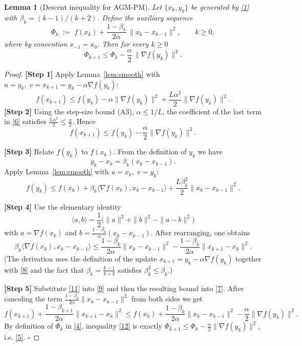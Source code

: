 \documentclass{article}
\newtheorem{lemma}{Lemma}
\begin{document}
\begin{lemma}[Descent inequality for AGM‑PM]\label{lem:descent}
Let \(\{x_k,y_k\}\) be generated by \eqref{1} with \(\beta_k=(k-1)/(k+2)\).
Define the auxiliary sequence
\[
\Phi_k \;:=\; f(x_k) + \frac{1-\beta_k}{2\alpha}\,\|x_k-x_{k-1}\|^{2},
\qquad k\ge 0,
\tag{4}
\]
where by convention \(x_{-1}=x_0\). Then for every \(k\ge0\)
\[
\Phi_{k+1}\le \Phi_k - \frac{\alpha}{2}\,\|\nabla f(y_k)\|^{2}.
\tag{5}
\]
\end{lemma}
\begin{proof}
\textbf{[Step 1]} Apply Lemma~\ref{lem:smooth} with
\(u=y_k,\;v=x_{k+1}=y_k-\alpha\nabla f(y_k)\):
\[
f(x_{k+1})\le f(y_k)-\alpha\|\nabla f(y_k)\|^{2}
               +\frac{L\alpha^{2}}{2}\|\nabla f(y_k)\|^{2}.
\tag{6}
\]
\textbf{[Step 2]} Using the step‑size bound (A3), \(\alpha\le 1/L\),
the coefficient of the last term in \eqref{6} satisfies
\(\frac{L\alpha^{2}}{2}\le\frac{\alpha}{2}\). Hence
\[
f(x_{k+1})\le f(y_k)-\frac{\alpha}{2}\|\nabla f(y_k)\|^{2}.
\tag{7}
\]

\textbf{[Step 3]} Relate \(f(y_k)\) to \(f(x_k)\). From the definition of
\(y_k\) we have
\[
y_k-x_k = \beta_k (x_k-x_{k-1}).
\tag{8}
\]
Apply Lemma~\ref{lem:smooth} with \(u=x_k,\;v=y_k\):
\[
f(y_k)\le f(x_k)+\beta_k\langle\nabla f(x_k),x_k-x_{k-1}\rangle
         +\frac{L\beta_k^{2}}{2}\|x_k-x_{k-1}\|^{2}.
\tag{9}
\]

\textbf{[Step 4]} Use the elementary identity
\[
\langle a,b\rangle =\frac12\bigl(\|a\|^{2}+\|b\|^{2}-\|a-b\|^{2}\bigr)
\tag{10}
\]
with \(a=\nabla f(x_k)\) and \(b=\frac{1-\beta_k}{\alpha}(x_k-x_{k-1})\).
After rearranging, one obtains
\[
\beta_k\langle\nabla f(x_k),x_k-x_{k-1}\rangle
   \le \frac{1-\beta_k}{2\alpha}\|x_k-x_{k-1}\|^{2}
        -\frac{1-\beta_k}{2\alpha}\|x_{k+1}-x_k\|^{2}.
\tag{11}
\]
(The derivation uses the definition of the update
\(x_{k+1}=y_k-\alpha\nabla f(y_k)\) together with \eqref{8} and
the fact that \(\beta_k=\frac{k-1}{k+2}\) satisfies
\(\beta_k^{2}\le\beta_k\).)

\textbf{[Step 5]} Substitute \eqref{11} into \eqref{9} and then the
resulting bound into \eqref{7}. After canceling the term
\(\frac{1-\beta_k}{2\alpha}\|x_k-x_{k-1}\|^{2}\) from both sides we get
\[
f(x_{k+1})+\frac{1-\beta_{k+1}}{2\alpha}\|x_{k+1}-x_k\|^{2}
\le
f(x_k)+\frac{1-\beta_k}{2\alpha}\|x_k-x_{k-1}\|^{2}
      -\frac{\alpha}{2}\|\nabla f(y_k)\|^{2}.
\tag{12}
\]
By definition of \(\Phi_k\) in \eqref{4}, inequality \eqref{12} is exactly
\(\Phi_{k+1}\le\Phi_k-\frac{\alpha}{2}\|\nabla f(y_k)\|^{2}\), i.e. \eqref{5}.
\hfill\(\square\)
\end{proof}
\end{document}
